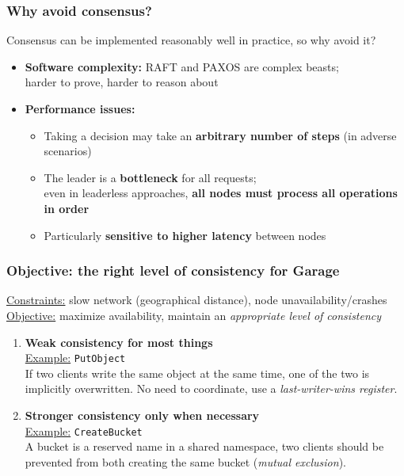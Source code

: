 \documentclass[aspectratio=169]{beamer}
\begin{document}
\begin{frame}
	\frametitle{Why avoid consensus?}
	Consensus can be implemented reasonably well in practice, so why avoid it?
	\vspace{2em}
	\begin{itemize}
		\item \textbf{Software complexity:} RAFT and PAXOS are complex beasts;\\
			harder to prove, harder to reason about
			\vspace{1.5em}
		\item \textbf{Performance issues:}
			\vspace{1em}
			\begin{itemize}
				\item Taking a decision may take an \textbf{arbitrary number of steps} (in adverse scenarios)
					\vspace{1em}
				\item The leader is a \textbf{bottleneck} for all requests;\\
					even in leaderless approaches, \textbf{all nodes must process all operations in order}
					\vspace{1em}
				\item Particularly \textbf{sensitive to higher latency} between nodes
			\end{itemize}
	\end{itemize}
\end{frame}

\begin{frame}
	\frametitle{Objective: the right level of consistency for Garage}

	\underline{Constraints:} slow network (geographical distance), node unavailability/crashes\\
	\underline{Objective:} maximize availability, maintain an \emph{appropriate level of consistency}\\
	\vspace{1em}
	\begin{enumerate}
		\item<2-> \textbf{Weak consistency for most things}\\
			\vspace{1em}
			\underline{Example:} \texttt{PutObject}\\
			\vspace{.5em}
			If two clients write the same
			object at the same time, one of the two is implicitly overwritten.
			No need to coordinate, use a \emph{last-writer-wins register}.
			\vspace{1em}
		\item<3-> \textbf{Stronger consistency only when necessary}\\
			\vspace{1em}
			\underline{Example:} \texttt{CreateBucket}\\
			\vspace{.5em}
			A bucket is a reserved name in a shared namespace,
			two clients should be prevented from both creating the same bucket
			(\emph{mutual exclusion}).
	\end{enumerate}
\end{frame}
\end{document}
